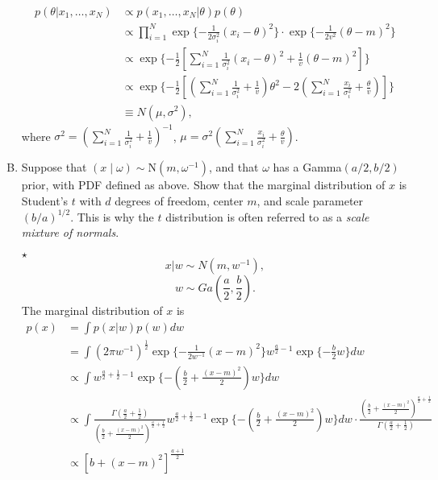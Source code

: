 \documentclass[11pt]{article}
\newcommand{\jie}{$\star$ }
\newcommand{\N}{\mbox{N}}
\begin{document}
\begin{enumerate}[(A)]
\begin{align*}
    p(\theta|x_1,\dots,x_N) &\propto p(x_1,\dots,x_N |\theta) p(\theta) \\
    &\propto \prod_{i=1}^N \exp \{-\frac{1}{2\sigma_i^2} (x_i-\theta)^2\} \cdot \exp \{-\frac{1}{2v^2} (\theta-m)^2\} \\
    &\propto \exp \{ -\frac{1}{2} [\sum_{i=1}^N \frac{1}{\sigma_i^2} (x_i-\theta)^2 + \frac{1}{v} (\theta-m)^2] \} \\
    &\propto \exp \{ -\frac{1}{2} [(\sum_{i=1}^N \frac{1}{\sigma_i^2} + \frac{1}{v}) \theta^2 - 2 (\sum_{i=1}^N \frac{x_i}{\sigma_i^2} + \frac{\theta}{v})] \} \\
    &\equiv N(\mu, \sigma^2),
\end{align*}
where $\sigma^2 = (\sum_{i=1}^N \frac{1}{\sigma_i^2} + \frac{1}{v} )^{-1}$, $\mu = \sigma^2 (\sum_{i=1}^N \frac{x_i}{\sigma_i^2} + \frac{\theta}{v})$.

\bigskip

\item Suppose that $(x \mid \omega) \sim \N(m, \omega^{-1})$, and that $\omega$ has a Gamma$(a/2, b/2)$ prior, with PDF defined as above.  Show that the marginal distribution of $x$ is Student's $t$ with $d$ degrees of freedom, center $m$, and scale parameter $(b/a)^{1/2}$.  This is why the $t$ distribution is often referred to as a \textit{scale mixture of normals}.

\bigskip

\jie
$$x|w \sim N(m,w^{-1}),$$
$$w \sim Ga(\frac{a}{2}, \frac{b}{2}).$$
The marginal distribution of $x$ is
\begin{align*}
    p(x) &= \int p(x|w) p(w) dw \\
    &= \int (2\pi w^{-1})^{\frac{1}{2}} \exp \{ -\frac{1}{2w^{-1}} (x-m)^2 \} w^{\frac{a}{2}-1} \exp \{-\frac{b}{2}w\} dw \\
    &\propto \int w^{\frac{a}{2}+\frac{1}{2} -1} \exp \{-(\frac{b}{2}+\frac{(x-m)^2}{2})w \} dw \\
    &\propto \int \frac{\Gamma(\frac{a}{2} + \frac{1}{2})}{(\frac{b}{2} + \frac{(x-m)^2}{2} )^{\frac{a}{2}+\frac{1}{2}} } w^{\frac{a}{2}+\frac{1}{2} -1} \exp \{-(\frac{b}{2}+\frac{(x-m)^2}{2})w \} dw \cdot \frac{(\frac{b}{2} + \frac{(x-m)^2}{2} )^{\frac{a}{2}+\frac{1}{2}} }{\Gamma(\frac{a}{2} + \frac{1}{2})} \\
    &\propto [b+(x-m)^2]^{\frac{a+1}{2}} \\
\end{align*}

\bigskip

\end{enumerate}
\end{document}
